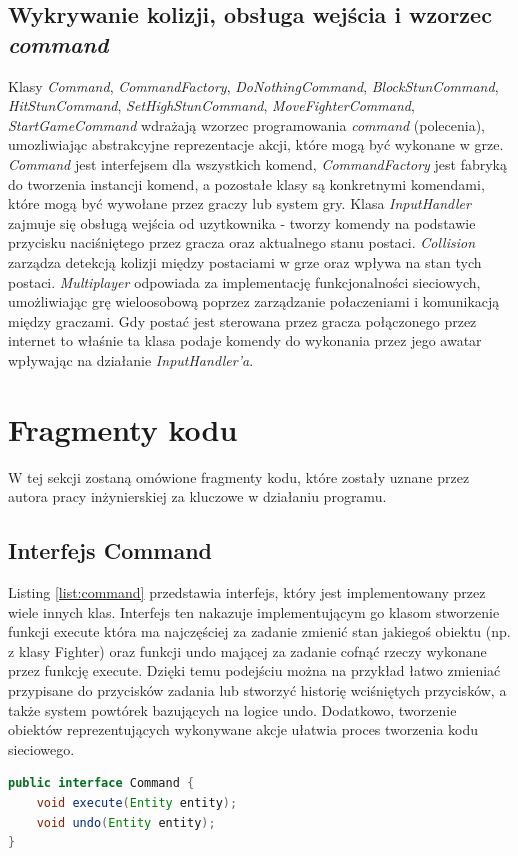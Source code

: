 \subsection{Wykrywanie kolizji, obsługa wejścia i wzorzec \emph{command}}
Klasy \emph{Command}, \emph{CommandFactory}, \emph{DoNothingCommand}, \emph{BlockStunCommand}, \emph{HitStunCommand}, \emph{SetHighStunCommand}, \emph{MoveFighterCommand}, \emph{StartGameCommand} wdrażają wzorzec programowania \emph{command} (polecenia), umozliwiając abstrakcyjne reprezentacje akcji, które mogą być wykonane w grze. \emph{Command} jest interfejsem dla wszystkich komend, \emph{CommandFactory} jest fabryką do tworzenia instancji komend, a pozostałe klasy są konkretnymi komendami, które mogą być wywołane przez graczy lub system gry. Klasa \emph{InputHandler} zajmuje się obsługą wejścia od uzytkownika - tworzy komendy na podstawie przycisku naciśniętego przez gracza oraz aktualnego stanu postaci. \emph{Collision} zarządza detekcją kolizji między postaciami w grze oraz wpływa na stan tych postaci. \emph{Multiplayer} odpowiada za implementację funkcjonalności sieciowych, umożliwiając grę wieloosobową poprzez zarządzanie połaczeniami i komunikacją między graczami. Gdy postać jest sterowana przez gracza połączonego przez internet to właśnie ta klasa podaje komendy do wykonania przez jego awatar wpływając na działanie \emph{InputHandler'a}.

\section{Fragmenty kodu}
W tej sekcji zostaną omówione fragmenty kodu, które zostały uznane przez autora pracy inżynierskiej za kluczowe w działaniu programu.
\subsection{Interfejs Command}
Listing \ref{list:command} przedstawia interfejs, który jest implementowany przez wiele innych klas. Interfejs ten nakazuje implementującym go klasom stworzenie funkcji execute która ma najczęściej za zadanie zmienić stan jakiegoś obiektu (np. z klasy Fighter) oraz funkcji undo mającej za zadanie cofnąć rzeczy wykonane przez funkcję execute. Dzięki temu podejściu można na przykład łatwo zmieniać przypisane do przycisków zadania lub stworzyć historię wciśniętych przycisków, a także system powtórek bazujących na logice undo. Dodatkowo, tworzenie obiektów reprezentujących wykonywane akcje ułatwia proces tworzenia kodu sieciowego.
\begin{lstlisting}[language=Java,style=JavaStyle,label=list:command,caption=Interfejs Command,
                   basicstyle=\footnotesize\ttfamily]
public interface Command {
    void execute(Entity entity);
    void undo(Entity entity);
}
\end{lstlisting}

